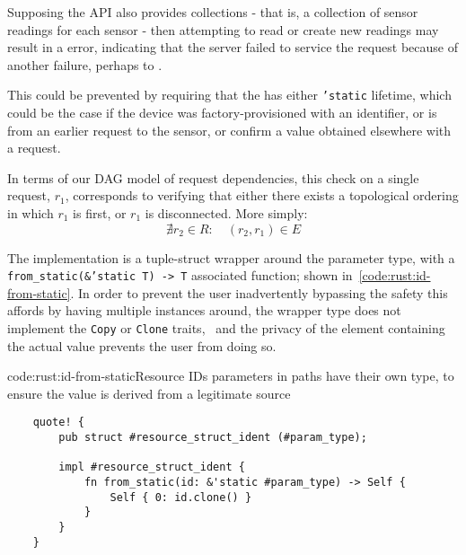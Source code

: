 Supposing the API also provides  collections - that is, a collection of sensor readings for each sensor - then attempting to read or create new readings may result in a  error, indicating that the server failed to service the request because of another failure, perhaps to .

This could be prevented by requiring that the  has either \texttt{'static} lifetime, which could be the case if the device was factory-provisioned with an identifier, or is from an earlier request to  the sensor, or confirm a value obtained elsewhere with a  request.

In terms of our DAG model of request dependencies, this check on a single request, $r_1$, corresponds to verifying that either there exists a topological ordering in which $r_1$ is first, or $r_1$ is disconnected. More simply: \[
\nexists{r_2\in{R}}\colon\quad (r_2, r_1) \in{E}
\]

The implementation is a tuple-struct wrapper around the parameter type, with a \texttt{from_static(&'static T) -> T} associated function; shown in~\cref{code:rust:id-from-static}. In order to prevent the user inadvertently bypassing the safety this affords by having multiple instances around, the wrapper type does not implement the \texttt{Copy} or \texttt{Clone} traits,~ and the privacy of the element containing the actual value prevents the user from doing so.

\begin{codelisting}{code:rust:id-from-static}{Resource IDs parameters in paths have their own type, to ensure the value is derived from a legitimate source}
\begin{spacing}{\codespacing}
\begin{verbatim}
    quote! {
        pub struct #resource_struct_ident (#param_type);
        
        impl #resource_struct_ident {
            fn from_static(id: &'static #param_type) -> Self {
                Self { 0: id.clone() }
            }
        }
    }
\end{verbatim}
\end{spacing}
\end{codelisting}